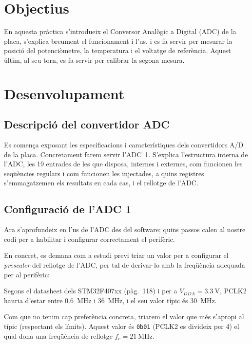 
\section{Objectius}

En aquesta pràctica s'introdueix el Conversor Analògic a Digital (ADC)
de la placa, s'explica breument el funcionament i l'us, i es fa servir
per mesurar la posició del potenciòmetre, la temperatura i el voltatge
de referència. Aquest últim, al seu torn, es fa servir per calibrar la segona mesura.

\section{Desenvolupament}


\subsection{Descripció del convertidor ADC}

Es comença exposant les especificacions i característiques dels convertidors
A/D de la placa. Concretament farem servir l'ADC~1. S'explica l'estructura
interna de l'ADC, les 19 entrades de les que disposa, internes i externes,
com funcionen les seqüències regulars i com funcionen les injectades, a quins
registres s'emmagatzemen els resultats en cada cas, i el rellotge de l'ADC.

\subsection{Configuració de l'ADC 1}

Ara s'aprofundeix en l'us de l'ADC des del software; quins passos calen
al nostre codi per a habilitar i configurar correctament el perifèric.

En concret, es demana com a estudi previ triar un valor per a configurar
el \emph{prescaler} del rellotge de l'ADC, per tal de derivar-lo amb la freqüència
adequada per al perifèric:

Segons el datasheet dels STM32F407xx (pàg.~118) i per a \(V_{DDA} = \SI{3.3}{\volt}\), PCLK2 hauria d'estar
entre \SI{0.6}{\mega\hertz} i \SI{36}{\mega\hertz}, i el seu valor típic és \SI{30}{\mega\hertz}.

Com que no tenim cap preferència concreta, triarem el valor que més s'apropi al típic (respectant els límits).
Aquest valor és \texttt{0b01} (PCLK2 es divideix per 4) el qual dona una freqüència de rellotge 
\(f_c = \SI{21}{\mega\hertz}\).

